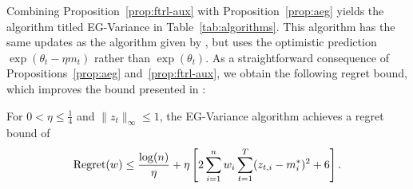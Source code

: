 \documentclass[paper_icml.tex]{subfiles}
\begin{document}
Combining Proposition~\ref{prop:ftrl-aux} with Proposition~\ref{prop:aeg} yields 
the algorithm titled EG-Variance in Table~\ref{tab:algorithms}. This algorithm has the 
same updates as the algorithm given by \cite{hazan2010variation}, but uses the 
optimistic prediction $\exp(\theta_t - \eta m_t)$ rather than $\exp(\theta_t)$. 
As a straightforward consequence of Propositions~\ref{prop:aeg} and~\ref{prop:ftrl-aux}, we 
obtain the following regret bound, which improves the bound presented in 
\cite{hazan2010variation}:
\begin{corollary}
\label{cor:EG-variance}
For $0 < \eta \leq \frac{1}{4}$ and $\|z_t\|_{\infty} \leq 1$, the EG-Variance 
algorithm achieves a regret bound of
\begin{equation*}\operatorname{Regret}(w) \leq \frac{\log(n)}{\eta} + \eta \left[ 2\sum_{i=1}^n w_i \sum_{t=1}^T (z_{t,i} - m_i^*)^2 + 6 \right].\end{equation*} 
\end{corollary}
\end{document}
